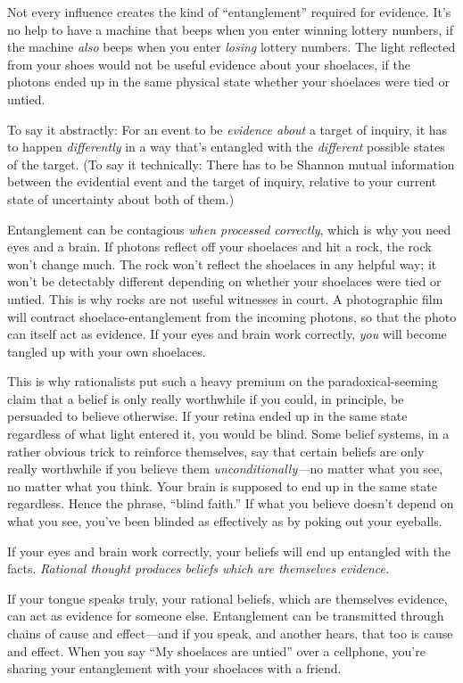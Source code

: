 {
 Not every influence creates the kind of
``entanglement'' required for
evidence. It's no help to have a machine that beeps
when you enter winning lottery numbers, if the machine \textit{also}
beeps when you enter \textit{losing} lottery numbers. The light
reflected from your shoes would not be useful evidence about your
shoelaces, if the photons ended up in the same physical state whether
your shoelaces were tied or untied.}

{
 To say it abstractly: For an event to be \textit{evidence about} a
target of inquiry, it has to happen \textit{differently} in a way
that's entangled with the \textit{different} possible
states of the target. (To say it technically: There has to be Shannon
mutual information between the evidential event and the target of
inquiry, relative to your current state of uncertainty about both of
them.)}

{
 Entanglement can be contagious \textit{when processed correctly},
which is why you need eyes and a brain. If photons reflect off your
shoelaces and hit a rock, the rock won't change much.
The rock won't reflect the shoelaces in any helpful
way; it won't be detectably different depending on
whether your shoelaces were tied or untied. This is why rocks are not
useful witnesses in court. A photographic film will contract
shoelace-entanglement from the incoming photons, so that the photo can
itself act as evidence. If your eyes and brain work correctly,
\textit{you} will become tangled up with your own shoelaces.}

{
 This is why rationalists put such a heavy premium on the
paradoxical-seeming claim that a belief is only really worthwhile if
you could, in principle, be persuaded to believe otherwise. If your
retina ended up in the same state regardless of what light entered it,
you would be blind. Some belief systems, in a rather obvious trick to
reinforce themselves, say that certain beliefs are only really
worthwhile if you believe them \textit{unconditionally---}no matter
what you see, no matter what you think. Your brain is supposed to end
up in the same state regardless. Hence the phrase,
``blind faith.'' If what you believe
doesn't depend on what you see, you've
been blinded as effectively as by poking out your eyeballs.}

{
 If your eyes and brain work correctly, your beliefs will end up
entangled with the facts. \textit{Rational thought produces beliefs
which are themselves evidence.}}

{
 If your tongue speaks truly, your rational beliefs, which are
themselves evidence, can act as evidence for someone else. Entanglement
can be transmitted through chains of cause and effect---and if you
speak, and another hears, that too is cause and effect. When you say
``My shoelaces are untied'' over a
cellphone, you're sharing your entanglement with your
shoelaces with a friend.}

